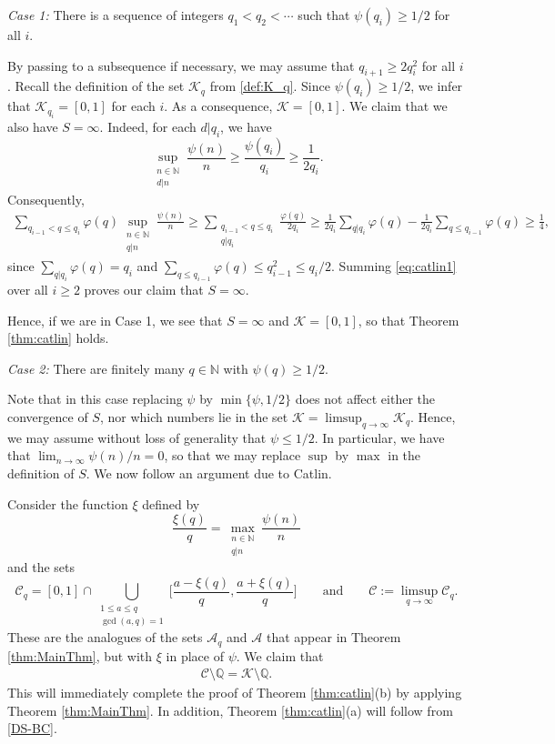 \documentclass[12pt]{amsart}
\numberwithin{equation}{section}
\theoremstyle{definition}
\theoremstyle{remark}
\newcommand{\N}{\mathbb{N}}
\newcommand{\Q}{\mathbb{Q}}
\newcommand{\CA}{\mathcal{A}}
\newcommand{\CC}{\mathcal{C}}
\newcommand{\CK}{\mathcal{K}}
\newcommand{\eq}[1]{ \begin{equation} \begin{split} #1 \end{split} \end{equation} }
\renewcommand{\phi}{\varphi}
\renewcommand{\le}{\leqslant}
\renewcommand{\ge}{\geqslant}
\begin{document}
\bigskip

\noindent
{\it Case 1:} There is a sequence of integers $q_1<q_2<\cdots$ such that $\psi(q_i)\ge1/2$ for all $i$. 

\medskip

By passing to a subsequence if necessary, we may assume that $q_{i+1}\ge 2q_i^2$ for all $i$. Recall the definition of the set $\CK_q$ from  \eqref{def:K_q}. Since $\psi(q_i)\ge1/2$, we infer that $\CK_{q_i}=[0,1]$ for each $i$. As a consequence, $\CK=[0,1]$. We claim that we also have $S=\infty$. Indeed, for each $d|q_i$, we have 
\[
\sup_{\substack{n\in\N\\ d|n}} \frac{\psi(n)}{n}\ge \frac{\psi(q_i)}{q_i}\ge\frac{1}{2q_i}.
\]
Consequently,
\eq{\label{eq:catlin1}
\sum_{q_{i-1}<q\le q_i} \phi(q)\sup_{\substack{n\in\N\\ q|n}} \frac{\psi(n)}{n}
\ge \sum_{\substack{q_{i-1}<q\le q_i\\ q|q_i}} \frac{\phi(q)}{2q_i}\ge  \frac{1}{2q_i}\sum_{q|q_i}\phi(q)-\frac{1}{2q_i}\sum_{q\le q_{i-1}}\phi(q)\ge \frac{1}{4},
}
since $\sum_{q|q_i}\phi(q)=q_i$ and $\sum_{q\le q_{i-1}}\phi(q)\le q_{i-1}^2\le q_i/2$. Summing \eqref{eq:catlin1} over all $i\ge2$ proves our claim that $S=\infty$.

Hence, if we are in Case 1, we see that $S=\infty$ and $\CK=[0,1]$, so that Theorem \ref{thm:catlin} holds.


\bigskip

\noindent
{\it Case 2:} There are finitely many $q\in\N$ with $\psi(q)\ge1/2$.

\medskip

Note that in this case replacing $\psi$ by $\min\{\psi,1/2\}$ does not affect either the convergence of $S$, nor which numbers lie in the set $\CK=\limsup_{q\to\infty}\CK_q$. Hence, we may assume without loss of generality that $\psi\le1/2$. In particular, we have that $\lim_{n\to\infty}\psi(n)/n=0$, so that we may replace $\sup$ by $\max$ in the definition of $S$. We now follow an argument due to Catlin.

Consider the function $\xi$ defined by 
\[
\frac{\xi(q)}{q}=\max_{\substack{n\in\N\\ q|n}} \frac{\psi(n)}{n}
\]
and the sets
\[
\CC_q= [0,1]\cap \bigcup_{\substack{1\le a\le q \\ \gcd(a,q)=1}}  \Big[\frac{a-\xi(q)}{q}, \frac{a+\xi(q)}{q}\Big] 
\qquad\text{and}\qquad 
\CC:= \limsup_{q\to\infty} \CC_q .
\]
These are the analogues of the sets $\CA_q$ and $\CA$ that appear in Theorem \ref{thm:MainThm}, but with $\xi$ in place of $\psi$. We claim that
\eq{\label{eq:catlin2}
\CC\setminus\Q=\CK\setminus\Q.
}
This will immediately complete the proof of Theorem \ref{thm:catlin}(b) by applying Theorem \ref{thm:MainThm}. In addition, Theorem \ref{thm:catlin}(a) will follow from \eqref{DS-BC}.
\end{document}
